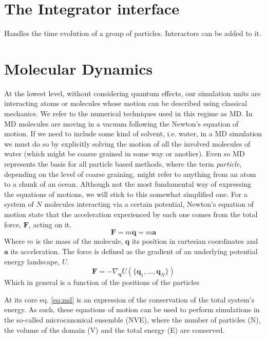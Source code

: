 \documentclass[ twoside,openright,titlepage,numbers=noenddot,%
headinclude,footinclude,cleardoublepage=empty,abstract=on,
BCOR=5mm,paper=a4,fontsize=11pt, dvipsnames
]{scrreprt}
\renewcommand{\vec}[1]{\bm{#1}}
\newcommand{\ppos}{q}
\begin{document}
\section{The Integrator interface}\label{sec:integrator}
Handles the time evolution of a group of particles.
Interactors can be added to it.



\section{Molecular Dynamics}\label{sec:md}

At the lowest level, without considering quantum effects, our simulation units are interacting atoms or molecules whose motion can be described using classical mechanics. We refer to the numerical techniques used in this regime as \gls{MD}.
In \gls{MD} molecules are moving in a vacuum following the Newton's equation of motion. If we need to include some kind of solvent, i.e. water, in a \gls{MD} simulation we must do so by explicitly solving the motion of all the involved molecules of water (which might be coarse grained in some way or another).
Even so \gls{MD} represents the basis for all particle based methods, where the term \emph{particle}, depending on the level of coarse graining, might refer to anything from an atom to a chunk of an ocean.
Although not the most fundamental way of expressing the equations of motions, we will stick to this somewhat simplified one. For a system of $N$ molecules interacting via a certain potential, Newton's equation of motion state that the acceleration experienced by each one comes from the total force, $\vec{F}$, acting on it.
\begin{equation}
  \label{eq:md}
  \vec{F} =  m\ddot{\vec{\ppos}} = m\vec{a}
\end{equation}
Where $m$ is the mass of the molecule, $\vec{\ppos}$ its position in cartesian coordinates and $\vec{a}$ its acceleration.
The force is defined as the gradient of an underlying potential energy landscape, $U$.
\begin{equation}
  \label{eq:mdfv}
  \vec{F} = -\nabla_{\vec{\ppos}} U(\{\vec{\ppos}_1,...,\vec{\ppos}_N\})
\end{equation}
Which in general is a function of the positions of the particles


At its core eq. \eqref{eq:md} is an expression of the conservation of the total system's energy. As such, these equations of motion can be used to perform simulations in the so-called microcanonical ensemble (NVE), where the number of particles (N), the volume of the domain (V) and the total energy (E) are conserved.
\end{document}
